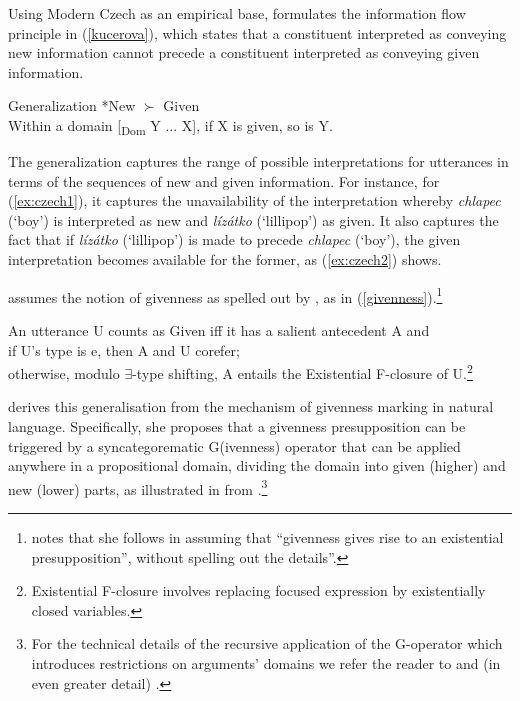 \documentclass[output=paper,modfonts,nonflat]{langsci/langscibook}
\begin{document}
Using Modern Czech as an empirical base, \citet{Kucerova:2012} formulates the information flow principle in (\ref{kucerova}), which states that a constituent interpreted as conveying new information cannot precede a constituent interpreted as conveying given information.

\ea \label{kucerova}
Generalization *New $\succ$ Given \\
Within a domain [\textsubscript{Dom} Y ... X], if X is given, so is Y. \hfill \citet[14]{Kucerova:2012}
\z

The generalization captures the range of possible interpretations for utterances in terms of the sequences of new and given information. For instance, for (\ref{ex:czech1}), it captures the unavailability of the interpretation whereby {\itshape chlapec} (`boy') is interpreted as new and {\itshape l\'{i}z\'{a}tko} (`lillipop') as given. It also captures the fact that if {\itshape l\'{i}z\'{a}tko} (`lillipop') is made to precede {\itshape chlapec} (`boy'), the given interpretation becomes available for the former, as (\ref{ex:czech2}) shows.

\citet[18]{Kucerova:2012} assumes the notion of givenness as spelled out by \citet[151]{Schwarzschild:1999}, as in (\ref{givenness}).\footnote{\citet[18]{Kucerova:2012} notes that she follows \citealt{Sauerland:2005} in assuming that  ``givenness gives rise to an existential presupposition'', without spelling out the details''.}

\ea\label{givenness}
An utterance U counts as Given iff it has a salient antecedent A and\\
\ea if U's type is e, then A and U corefer;\\
\ex otherwise, modulo $\exists$-type shifting, A entails the Existential F-closure of U.\footnote{Existential F-closure involves replacing focused expression by existentially closed variables.}
\z
\z

\citet[14]{Kucerova:2012} derives this generalisation from the mechanism of givenness marking in natural language. Specifically, she proposes that a givenness presupposition can be triggered by a syncategorematic G(ivenness) operator that can be applied anywhere in a propositional domain, dividing the domain into given (higher) and new (lower) parts, as illustrated in  from \citet[3]{Kucerova:2012}.\footnote{For the technical details of the recursive application of the G-operator which introduces restrictions on arguments' domains we refer the reader to \citet{Kucerova:2012} and (in even greater detail) \citet{SimikWierzba:2015}.}
\end{document}
